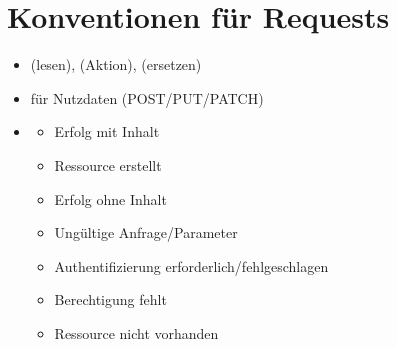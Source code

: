 \documentclass[letterpaper,10pt,english]{sphinxmanual}
\begin{document}
\section{Konventionen für Requests}
\label{\detokenize{agv_overview:konventionen-fur-requests}}\begin{itemize}
\item {} 
\sphinxAtStartPar
{}  (lesen),  (Aktion),  (ersetzen)

\item {} 
\sphinxAtStartPar
{}  für Nutzdaten (POST/PUT/PATCH)

\item {} \begin{description}
\begin{itemize}
\item {} 
\sphinxAtStartPar
{} \textendash{} Erfolg mit Inhalt

\item {} 
\sphinxAtStartPar
{} \textendash{} Ressource erstellt

\item {} 
\sphinxAtStartPar
{} \textendash{} Erfolg ohne Inhalt

\item {} 
\sphinxAtStartPar
{} \textendash{} Ungültige Anfrage/Parameter

\item {} 
\sphinxAtStartPar
{} \textendash{} Authentifizierung erforderlich/fehlgeschlagen

\item {} 
\sphinxAtStartPar
{} \textendash{} Berechtigung fehlt

\item {} 
\sphinxAtStartPar
{} \textendash{} Ressource nicht vorhanden

\end{itemize}

\end{description}

\end{itemize}
\end{document}

